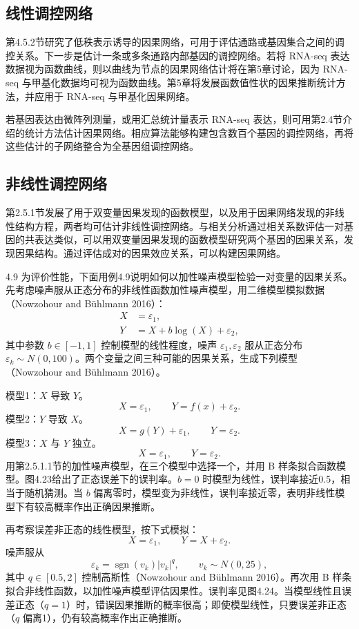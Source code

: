 \subsection{线性调控网络}
第4.5.2节研究了低秩表示诱导的因果网络，可用于评估通路或基因集合之间的调控关系。下一步是估计一条或多条通路内部基因的调控网络。若将 RNA-seq 表达数据视为函数曲线，则以曲线为节点的因果网络估计将在第5章讨论，因为 RNA-seq 与甲基化数据均可视为函数曲线。第5章将发展函数值性状的因果推断统计方法，并应用于 RNA-seq 与甲基化因果网络。

若基因表达由微阵列测量，或用汇总统计量表示 RNA-seq 表达，则可用第2.4节介绍的统计方法估计因果网络。相应算法能够构建包含数百个基因的调控网络，再将这些估计的子网络整合为全基因组调控网络。

\subsection{非线性调控网络}
第2.5.1节发展了用于双变量因果发现的函数模型，以及用于因果网络发现的非线性结构方程，两者均可估计非线性调控网络。与相关分析通过相关系数评估一对基因的共表达类似，可以用双变量因果发现的函数模型研究两个基因的因果关系，发现因果结构。通过评估成对的因果效应关系，可以构建因果网络。

\begin{bookexample}{4.9}
为评价性能，下面用例4.9说明如何以加性噪声模型检验一对变量的因果关系。先考虑噪声服从正态分布的非线性函数加性噪声模型，用二维模型模拟数据（Nowzohour and Bühlmann 2016）：
\[
\begin{aligned}
X&=\varepsilon_1,\\
Y&=X+b\log(X)+\varepsilon_2,
\end{aligned}
\]
其中参数 $b\in[-1,1]$ 控制模型的线性程度，噪声 $\varepsilon_1,\varepsilon_2$ 服从正态分布 $\varepsilon_k\sim N(0,100)$。两个变量之间三种可能的因果关系，生成下列模型（Nowzohour and Bühlmann 2016）。

\noindent 模型1：$X$ 导致 $Y$。
\[
X=\varepsilon_1,\qquad Y=f(x)+\varepsilon_2.
\]
\noindent 模型2：$Y$ 导致 $X$。
\[
X=g(Y)+\varepsilon_1,\qquad Y=\varepsilon_2.
\]
\noindent 模型3：$X$ 与 $Y$ 独立。
\[
X=\varepsilon_1,\qquad Y=\varepsilon_2.
\]
用第2.5.1.1节的加性噪声模型，在三个模型中选择一个，并用 B 样条拟合函数模型。图4.23给出了正态误差下的误判率。$b=0$ 时模型为线性，误判率接近0.5，相当于随机猜测。当 $b$ 偏离零时，模型变为非线性，误判率接近零，表明非线性模型下有较高概率作出正确因果推断。

再考察误差非正态的线性模型，按下式模拟：
\[
X=\varepsilon_1,\qquad Y=X+\varepsilon_2.
\]
噪声服从
\[
\varepsilon_k=\operatorname{sgn}(v_k)|v_k|^q,\qquad v_k\sim N(0,25),
\]
其中 $q\in[0.5,2]$ 控制高斯性（Nowzohour and Bühlmann 2016）。再次用 B 样条拟合非线性函数，以加性噪声模型评估因果性。误判率见图4.24。当模型线性且误差正态（$q=1$）时，错误因果推断的概率很高；即使模型线性，只要误差非正态（$q$ 偏离1），仍有较高概率作出正确推断。
\end{bookexample}




